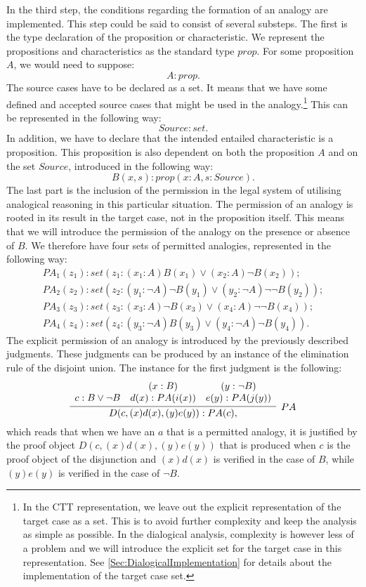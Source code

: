 		In the third step, the conditions regarding the formation of an analogy are implemented. This step could be said to consist of several substeps. The first is the type declaration of the proposition or characteristic. We represent the propositions and characteristics as the standard type $prop$. For some proposition $A$, we would need to suppose:
			\[
				A : prop.
			\]
		The source cases have to be declared as a set. It means that we have some defined and accepted source cases that might be used in the analogy.\footnote{In the CTT representation, we leave out the explicit representation of the target case as a set. This is to avoid further complexity and keep the analysis as simple as possible. In the dialogical analysis, complexity is however less of a problem and we will introduce the explicit set for the target case in this representation. See \autoref{Sec:DialogicalImplementation} for details about the implementation of the target case set.} This can be represented in the following way:
			\[   
				Source : set.
			\]
		In addition, we have to declare that the intended entailed characteristic is a proposition. This proposition is also dependent on both the proposition $A$ and on the set $Source$, introduced in the following way:
			\[
				B(x,s) : prop (x : A, s : Source).
			\]
		The last part is the inclusion of the permission in the legal system of utilising analogical reasoning in this particular situation. The permission of an analogy is rooted in its result in the target case, not in the proposition itself. This means that we will introduce the permission of the analogy on the presence or absence of $B$. We therefore have four sets of permitted analogies, represented in the following way:
			\[
			\begin{array}{l}
				PA_1(z_1) : set (z_1 : (x_1 : A) B(x_1) \lor (x_2 : A) \neg B(x_2)); \\
				PA_2(z_2) : set (z_2 : (y_1 : \neg A) \neg B(y_1) \lor (y_2 : \neg A) \neg \neg B(y_2)); \\
				PA_3(z_3) : set (z_3 : (x_3 : A) \neg B(x_3) \lor (x_4 : A) \neg \neg B(x_4)); \\
				PA_4(z_4) : set (z_4 : (y_3 : \neg A) B(y_3) \lor (y_4 : \neg A) \neg B(y_4)). 
			\end{array}
			\]
		The explicit permission of an analogy is introduced by the previously described judgments. These judgments can be produced by an instance of the elimination rule of the disjoint union. The instance for the first judgment is the following:
			\[
			\infer[PA]{D(c, (x)d(x), (y)e(y)) : PA(c),}{\begin{array}{ccc} & (x : B) & (y : \neg B) \\
			c : B \lor \neg B & d(x) : PA(i(x)) & e(y) : PA(j(y)) \end{array}}
			\]
		which reads that when we have an $a$ that is a permitted analogy, it is justified by the proof object $D(c, (x)d(x), (y)e(y))$ that is produced when $c$ is the proof object of the disjunction and $(x)d(x)$ is verified in the case of $B$, while $(y)e(y)$ is verified in the case of $\neg B$. 
		
